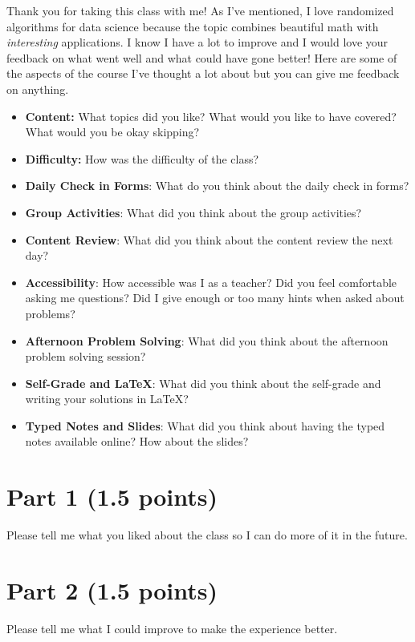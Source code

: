 \documentclass{article}
\begin{document}
Thank you for taking this class with me!
As I've mentioned, I love randomized algorithms for data science because the topic combines beautiful math with \emph{interesting} applications.
I know I have a lot to improve and I would love your feedback on what went well and what could have gone better!
Here are some of the aspects of the course I've thought a lot about but you can give me feedback on anything.
\begin{itemize}
    \item \textbf{Content:} What topics did you like? What would you like to have covered? What would you be okay skipping?
    \item \textbf{Difficulty:} How was the difficulty of the class? 
    \item \textbf{Daily Check in Forms}: What do you think about the daily check in forms?
    \item \textbf{Group Activities}: What did you think about the group activities? 
    \item \textbf{Content Review}: What did you think about the content review the next day?
    \item \textbf{Accessibility}: How accessible was I as a teacher? Did you feel comfortable asking me questions? Did I give enough or too many hints when asked about problems? 
    \item \textbf{Afternoon Problem Solving}: What did you think about the afternoon problem solving session? 
    \item \textbf{Self-Grade and LaTeX}: What did you think about the self-grade and writing your solutions in LaTeX?
    \item \textbf{Typed Notes and Slides}: What did you think about having the typed notes available online? How about the slides?
\end{itemize}

\section*{Part 1 (1.5 points)}
Please tell me what you liked about the class so I can do more of it in the future.

\section*{Part 2 (1.5 points)}
Please tell me what I could improve to make the experience better.
\end{document}
